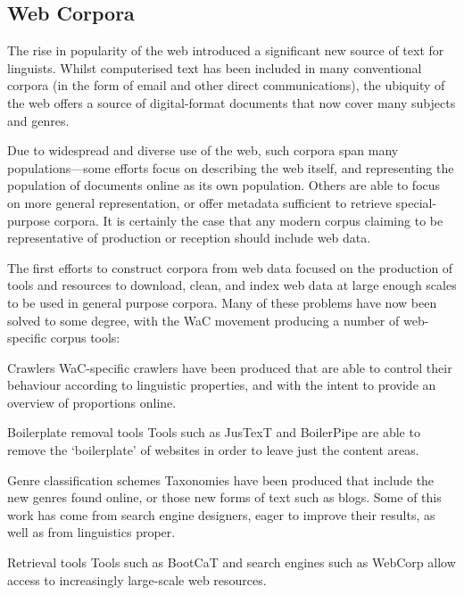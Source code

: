 
\subsection{Web Corpora}
The rise in popularity of the web introduced a significant new source of text for linguists.  Whilst computerised text has been included in many conventional corpora (in the form of email and other direct communications), the ubiquity of the web offers a source of digital-format documents that now cover many subjects and genres.

Due to widespread and diverse use of the web, such corpora span many populations---some efforts focus on describing the web itself, and representing the population of documents online as its own population.  Others are able to focus on more general representation, or offer metadata sufficient to retrieve special-purpose corpora.  It is certainly the case that any modern corpus claiming to be representative of production or reception should include web data.

The first efforts to construct corpora from web data\cite{kilgarriff2001web} focused on the production of tools and resources to download, clean, and index web data at large enough scales to be used in general purpose corpora.  Many of these problems have now been solved to some degree, with the WaC movement producing a number of web-specific corpus tools:

\begin{itemizeTitle}
    
    \item[Crawlers] WaC-specific crawlers have been produced that are able to control their behaviour according to linguistic properties\cite{schafer2014focused}, and with the intent to provide an overview of proportions online.

    \item[Boilerplate removal tools] Tools such as JusTexT\cite{pomikalek2013justext} and BoilerPipe\cite{kohlschtterboilerplate} are able to remove the `boilerplate' of websites in order to leave just the content areas.

    \item[Genre classification schemes] Taxonomies have been produced that include the new genres found online, or those new forms of text such as blogs.  Some of this work has come from search engine designers, eager to improve their results\cite{genreclassification2004}, as well as from linguistics proper\cite{sharoff2007classifying,santini10genreintro,sharoffs2015}.

    \item[Retrieval tools] Tools such as BootCaT\cite{baroni2004bootcat} and search engines such as WebCorp\cite{renouf2003webcorp} allow access to increasingly large-scale web resources.

\end{itemizeTitle}

